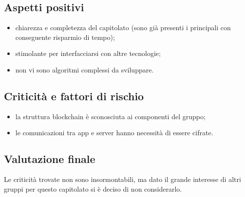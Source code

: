 \subsection{Aspetti positivi}
\begin{itemize}
\item chiarezza e completezza del capitolato (sono già presenti i  principali con conseguente risparmio di tempo);
\item stimolante per interfacciarsi con altre tecnologie; 
\item non vi sono algoritmi complessi da sviluppare.
\end{itemize}

\subsection{Criticità e fattori di rischio}
\begin{itemize}
\item la struttura blockchain è sconosciuta ai componenti del gruppo;
\item le comunicazioni tra app e server hanno necessità di essere cifrate.
\end{itemize}

\subsection{Valutazione finale}
Le criticità trovate non sono insormontabili, ma dato il grande interesse di altri gruppi per questo capitolato si è deciso di non considerarlo.
